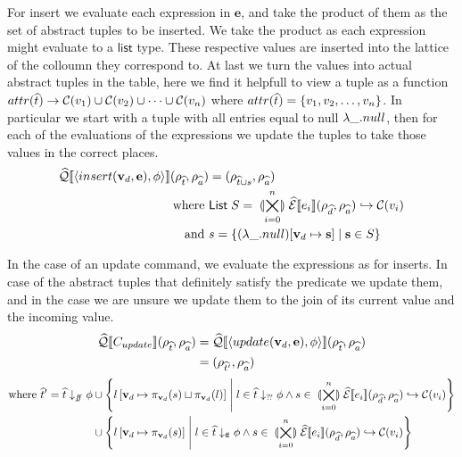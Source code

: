 For insert we evaluate each expression in $\mathbf{e}$, and take the product of them as the set of abstract tuples to be inserted.
We take the product as each expression might evaluate to a $\mathsf{list}$ type.
These respective values are inserted into the lattice of the colloumn they correspond to.
At last we turn the values into actual abstract tuples in the table, here we find it helpfull to view a tuple as a function $attr(\widehat{t}) \rightarrow \mathcal{C}(v_1) \cup \mathcal{C}(v_2) \cup \dots \cup \mathcal{C}(v_n)$ where $attr(\widehat{t}) = \{v_1, v_2, \dots, v_n\}$.
In particular we start with a tuple with all entries equal to null $\lambda\_.null$, then for each of the evaluations of the expressions we update the tuples to take those values in the correct places.
\begin{align}
    \widehat{\mathcal{Q}}\llbracket \langle insert(\mathbf{v}_d, \mathbf{e}), \phi \rangle \rrbracket(\rho_{\widehat{t}}, \rho_{\widehat{a}}) & = (\rho_{\widehat{t} \cup s}, \rho_{\widehat{a}}) \\
    \text{where }& \mathsf{List} \; S = \;\llparenthesis\bigtimes_{i = 0}^{n}\rrparenthesis\; \widehat{\mathcal{E}}\llbracket e_i \rrbracket(\rho_{\widehat{d}}, \rho_{\widehat{a}}) \hookrightarrow \mathcal{C}(v_i) \\
    \text{and }& s = \left\{ (\lambda\_.null)[\mathbf{v}_d \mapsto \mathbf{s}] \;\middle|\; \mathbf{s} \in S\right\}
\end{align}

In the case of an update command, we evaluate the expressions as for inserts.
In case of the abstract tuples that definitely satisfy the predicate we update them, and in the case we are unsure we update them to the join of its current value and the incoming value.
\begin{align}
    \widehat{\mathcal{Q}}\llbracket C_{update} \rrbracket(\rho_{\widehat{t}}, \rho_{\widehat{a}})
                                              & = \widehat{\mathcal{Q}}\llbracket \langle update(\mathbf{v}_d, \mathbf{e}), \phi \rangle \rrbracket (\rho_{\widehat{t}}, \rho_{\widehat{a}}) \\
                                              & = (\rho_{\widehat{t}'}, \rho_{\widehat{a}})
\end{align}
\begin{align}
    \text{where } \widehat{t}' = \widehat{t} \downarrow_{f\!\!f} \phi
    & \cup \left\{ l\left[ \mathbf{v}_d \mapsto \pi_{\mathbf{v}_d}(s) \sqcup \pi_{\mathbf{v}_d}(l) \right] \;\middle|\; l \in \widehat{t} \downarrow_{?\!?} \phi \land s \in \;\llparenthesis\bigtimes_{i = 0}^{n}\rrparenthesis\; \widehat{\mathcal{E}}\llbracket e_i \rrbracket(\rho_{\widehat{d}}, \rho_{\widehat{a}}) \hookrightarrow \mathcal{C}(v_i)\right\} \\
    & \cup \left\{ l\left[ \mathbf{v}_d \mapsto \pi_{\mathbf{v}_d}(s) \right] \;\middle|\; l \in \widehat{t} \downarrow_{t\!t} \phi \land s \in \;\llparenthesis\bigtimes_{i = 0}^{n}\rrparenthesis\; \widehat{\mathcal{E}}\llbracket e_i \rrbracket(\rho_{\widehat{d}}, \rho_{\widehat{a}}) \hookrightarrow \mathcal{C}(v_i)\right\}
\end{align}

